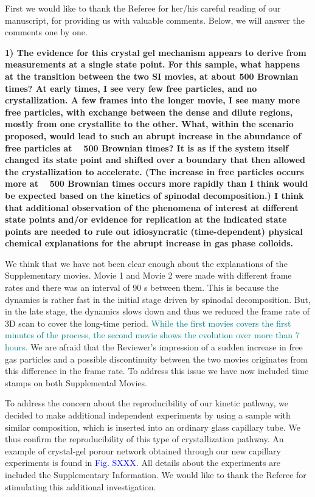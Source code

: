 \documentclass[11pt,a4paper]{article}
\newenvironment{referee}%
{\bigskip\singlespacing\bf}%
{\par\bigskip}
\begin{document}
First we would like to thank the Referee for her/his careful reading of our manuscript, for providing us with valuable comments. Below, we will answer the comments one by one. 


\begin{referee}
1) The evidence for this crystal gel mechanism appears to derive from measurements at a single state point. For this sample, what happens at the transition between the two SI movies, at about 500 Brownian times? At early times, I see very few free particles, and no crystallization. A few frames into the longer movie, I see many more free particles, with exchange between the dense and dilute regions, mostly from one crystallite to the other. What, within the scenario proposed, would lead to such an abrupt increase in the abundance of free particles at ~ 500 Brownian times? It is as if the system itself changed its state point and shifted over a boundary that then allowed the crystallization to accelerate. (The increase in free particles occurs more at ~ 500 Brownian times occurs more rapidly than I think would be expected based on the kinetics of spinodal decomposition.) I think that additional observation of the phenomena of interest at different state points and/or evidence for replication at the indicated 
state points are needed to rule out idiosyncratic (time-dependent) physical chemical explanations for the abrupt increase in gas phase colloids.
\end{referee}


We think that we have not been clear enough about the explanations of the Supplementary movies. Movie 1 and Movie 2 were made with different frame rates and there was an interval of 90 s between them. This is because the dynamics is rather fast in the initial stage driven by spinodal decomposition. But, in the late stage, the dynamics slows down and thus we reduced the frame rate of 3D scan to cover the long-time period. \textcolor{teal}{While the first movies covers
the first minutes of the process, the second movie shows the evolution over more than 7 hours.} We are afraid that the Reviewer’s impression of a sudden increase in free gas particles and a possible discontinuity between the two movies originates from this difference in the frame rate.
To address this issue we have now included time stamps on both Supplemental Movies.

To address the concern about the reproducibility of our kinetic pathway, we decided to make additional independent experiments
by using a sample with similar composition, which is inserted into an ordinary glass capillary tube. We thus confirm the reproducibility of this type of crystallization pathway. An example of crystal-gel porour network obtained through our new capillary experiments
is found in \textcolor{blue}{Fig. SXXX}. All details about the experiments are included the Supplementary Information. We would like to thank the Referee for stimulating
this additional investigation.
\end{document}
